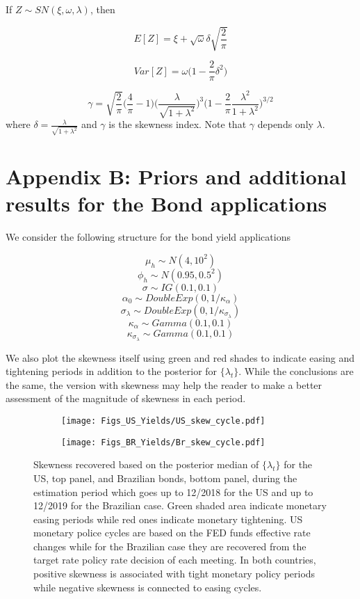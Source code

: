 \documentclass{article}
\begin{document}
If $Z \sim SN(\xi, \omega, \lambda)$, then 

$$ E[Z] = \xi + \sqrt{\omega}\delta \sqrt{\frac{2}{\pi}} $$

$$ Var[Z] = \omega \Bigg( 1 - \frac{2}{\pi} \delta^2 \Bigg)$$

$$ \gamma = \sqrt{\frac{2}{\pi}} \Bigg( \frac{4}{\pi} - 1 \Bigg) \Bigg( \frac{\lambda}{\sqrt{1 + \lambda^2}} \Bigg)^3 \Bigg( 1 - \frac{2}{\pi} \frac{\lambda^2}{1 + \lambda^2} \Bigg)^{3/2}$$
where $\delta = \frac{\lambda}{\sqrt{1 + \lambda^2}}$ and $\gamma$ is the skewness index. Note that $\gamma$ depends only $\lambda$. 

\clearpage
\section*{Appendix B: Priors and additional results for the Bond applications}

We consider the following structure for the bond yield applications 

$$ \mu_h \sim N(4,10^2)$$
$$ \phi_h \sim N(0.95,0.5^2)$$
$$ \sigma \sim IG(0.1,0.1) $$
$$ \alpha_0 \sim DoubleExp(0,1/\kappa_{\alpha})$$
$$ \sigma_{\lambda} \sim DoubleExp(0,1/\kappa_{\sigma_{\lambda}})$$
$$ \kappa_{\alpha} \sim Gamma(0.1, 0.1) $$
$$ \kappa_{\sigma_{\lambda}}\sim Gamma(0.1, 0.1) $$

We also plot the skewness itself using green and red shades to indicate easing and tightening periods in addition to the posterior for $\{\lambda_t\}$. While the conclusions are the same, the version with skewness may help the reader to make a better assessment of the magnitude of skewness in each period. 


\begin{figure}[h!]
\centering
\begin{subfigure}[b]{0.95\textwidth}
\texttt{[image: Figs\_US\_Yields/US\_skew\_cycle.pdf]} 
   \caption{}
   \label{fig:us_skew_cycle} 
\end{subfigure}

\begin{subfigure}[b]{0.95\textwidth}
\texttt{[image: Figs\_BR\_Yields/Br\_skew\_cycle.pdf]} 
   \caption{}
   \label{fig:br_skew_cycle}
\end{subfigure}
\caption{Skewness recovered based on the posterior median of $\{\lambda_t\}$ for the US, top panel, and Brazilian bonds, bottom panel, during the estimation period which goes up to 12/2018 for the US and up to 12/2019 for the Brazilian case. Green shaded area indicate monetary easing periods while red ones indicate monetary tightening. US monetary police cycles are based on the FED funds effective rate changes while for the Brazilian case they are recovered from the target rate policy rate decision of each meeting. In both countries, positive skewness is associated with tight monetary policy periods while negative skewness is connected to easing cycles. }
\end{figure}
\end{document}

